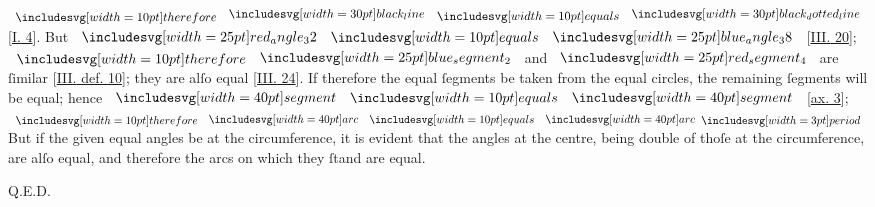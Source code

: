 \documentclass[11pt,preview]{standalone}
\begin{document}
\raggedright $\btherefore \blackline \bequals \dottedblackline$ [\hyperref[book1pr4]{\textsc{I.} 4}].  But $\img{red_angle_32} \bequals \img{blue_angle_38}$ [\hyperref[book3pr20]{\textsc{III.} 20}]; $\btherefore \img{blue_segment_2}$ and $\img{red_segment_4}$ are ſimilar [\hyperref[book3def10]{\textsc{III.} def. 10}]; they are alſo equal [\hyperref[book3pr24]{\textsc{III.} 24}].  If therefore the equal ſegments be taken from the equal circles, the remaining ſegments will be equal; hence $\img[0][0][40]{segment} \bequals \img[0][0][40]{segment}$ [\hyperref[ax3]{ax. 3}]; $\btherefore \img[0][0][40]{arc} \bequals \img[0][0][40]{arc} \bperiod$  But if the given equal angles be at the circumference, it is evident that the angles at the centre, being double of thoſe at the circumference, are alſo equal, and therefore the arcs on which they ſtand are equal.

\hfill Q.E.D.
\end{document}
